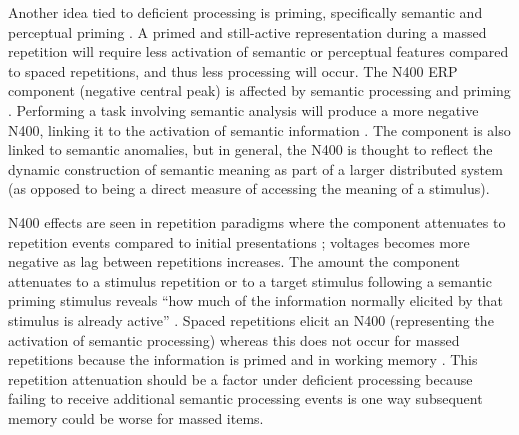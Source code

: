 Another idea tied to deficient processing is priming, specifically semantic \cite{Chal1993} and perceptual priming \cite{MammEtal2002,RussEtal1998}.  A primed and still-active representation during a massed repetition will require less activation of semantic or perceptual features compared to spaced repetitions, and thus less processing will occur.
The N400 ERP component (negative central peak)
is affected by semantic processing and priming \cite<for a review, see>{KutaFede2011}.  Performing a task involving semantic analysis will produce a more negative N400, linking it to the activation of semantic information \cite{KutaHill1980}.  The component is also linked to semantic anomalies, but in general, the N400 is thought to reflect the dynamic construction of semantic meaning as part of a larger distributed system (as opposed to being a direct measure of accessing the meaning of a stimulus).

N400 effects are seen in repetition paradigms where the component attenuates to repetition events compared to initial presentations \cite{KimEtal2001,OlicEtal2000,VanSEtal2007}; voltages becomes more negative as lag between repetitions increases.  The amount the component attenuates to a stimulus repetition or to a target stimulus following a semantic priming stimulus reveals ``how much of the information normally elicited by that stimulus is already active'' \cite[p.~23]{KutaFede2011}.  Spaced repetitions elicit an N400 (representing the activation of semantic processing) whereas this does not occur for massed repetitions because the information is primed and in working memory \cite{VanSEtal2007}.  This repetition attenuation should be a factor under deficient processing because failing to receive additional semantic processing events is one way subsequent memory could be worse for massed items.


